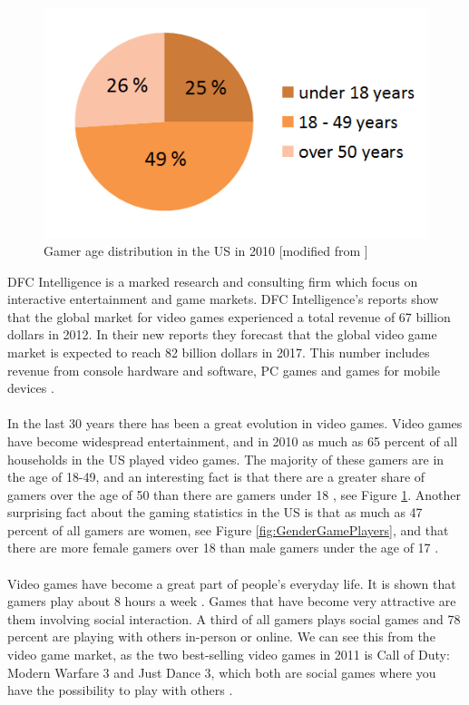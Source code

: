 \begin{figure}
\begin{center}
\includegraphics[scale=0.5]{gamersus}
\caption[Gamer age distribution]{Gamer age distribution in the US in 2010 [modified from \cite{statistics2012}]}
\label{fig:GamersUS}
\end{center}
\end{figure}
DFC Intelligence is a marked research and consulting firm which focus on interactive entertainment and game markets. DFC Intelligence's reports show that the global market for video games experienced a total revenue of 67 billion dollars in 2012. In their new reports they forecast that the global video game market is expected to reach 82 billion dollars in 2017. This number includes revenue from console hardware and software, PC games and games for mobile devices \cite{videogameforcast} \cite{aboutdfcint}.\\ \\
In the last 30 years there has been a great evolution in video games. Video games have become widespread entertainment, and in 2010 as much as 65 percent of all households in the US played video games. The majority of these gamers are in the age of 18-49, and an interesting fact is that there are a greater share of gamers over the age of 50 than there are gamers under 18 \cite{statistics2010} \cite{statistics2012}, see Figure \ref{fig:GamersUS}. Another surprising fact about the gaming statistics in the US is that as much as 47 percent of all gamers are women, see Figure \ref{fig:GenderGamePlayers}, and that there are more female gamers over 18 than male gamers under the age of 17 \cite{statistics2012real}. \\ \\
Video games have become a great part of people's everyday life. It is shown that gamers play about 8 hours a week \cite{statistics2010}. Games that have become very attractive are them involving social interaction. A third of all gamers plays social games and 78 percent are playing with others in-person or online. We can see this from the video game market, as the two best-selling video games in 2011 is Call of Duty: Modern Warfare 3 and Just Dance 3, which both are social games where you have the possibility to play with others \cite{statistics2012real}. \\ \\ 
